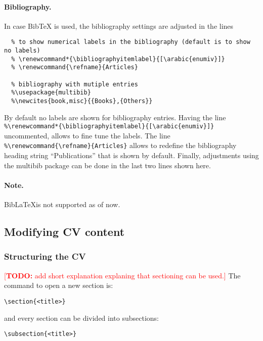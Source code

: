 \documentclass[a4paper,11pt]{article}
\newcommand{\todox}[1]{\textcolor{red}{[\textbf{TODO:} #1]}}
\newcommand{\biblatex}{BibLaTeX}
\begin{document}
\paragraph{Bibliography.}
In case BibTeX is used, the bibliography settings are adjusted in the lines 
\begin{lstlisting}
  % to show numerical labels in the bibliography (default is to show no labels)
  % \renewcommand*{\bibliographyitemlabel}{[\arabic{enumiv}]}
  % \renewcommand{\refname}{Articles}

  % bibliography with mutiple entries
  %\usepackage{multibib}
  %\newcites{book,misc}{{Books},{Others}}
\end{lstlisting}
By default no labels are shown for bibliography entries. 
Having the line 
\lstinline!%\renewcommand*{\bibliographyitemlabel}{[\arabic{enumiv}]}! uncommented, 
allows to fine tune the labels. 
The line \lstinline!%\renewcommand{\refname}{Articles}! allows to redefine the bibliography heading string ``Publications'' that is shown by default. 
Finally, adjustments using the multibib package can be done in the last two lines shown here. 

\paragraph{Note.} \biblatex is not supported as of now.

\subsection{Modifying CV content}
\subsubsection{Structuring the CV}
\todox{add short explanation explaning that sectioning can be used.}
The command to open a new section is: 

\begin{verbatim}
\section{<title>}
\end{verbatim}

and every section can be divided into subsections:

\begin{verbatim}
\subsection{<title>}
\end{verbatim}
\end{document}
